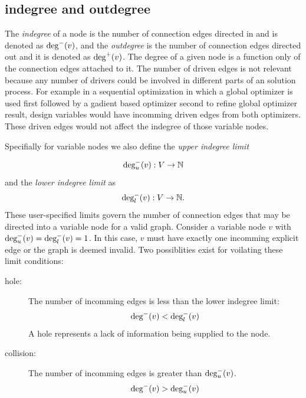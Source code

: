 \subsection{indegree and outdegree}
  \label{s:indegree-outdegree}
  The \emph{indegree} of a node is the number of connection edges directed in and 
  is denoted as $\textrm{deg}^-(v)$, and the \emph{outdegree} 
  is the number of connection edges directed out and it is denoted as $\textrm{deg}^+(v)$.
  The degree of a given node is a function only of the connection edges 
  attached to it. The number of driven edges is not relevant because any number 
  of drivers could be involved in different parts of an solution process. For 
  example in a sequential optimization in which a global optimizer is used first 
  followed by a gadient based optimizer second to refine global optimizer 
  result, design variables would have incomming driven edges from both optimizers. 
  These driven edges would not affect the indegree of those variable nodes. 

  Specifially for variable nodes we also define the \emph{upper indegree limit} 

  \begin{equation}
  \textrm{deg}_u^-(v):V \to \mathbb{N}
  \end{equation} 
  and the \emph{lower indegree limit} as
  \begin{equation}
  \textrm{deg}_l^-(v):V \to \mathbb{N}.
  \end{equation}
  These user-specified limits govern the number of connection edges that may 
  be directed into a variable node for a valid graph. Consider a variable 
  node $v$ with $\textrm{deg}_u^-(v) = \textrm{deg}_l^-(v) = 1$. In this case, $v$ 
  must have exactly one incomming explicit edge or the graph is deemed invalid. 
  Two possiblities exist for voilating these limit conditions: 

  \begin{description}
    \item[hole: ] The number of incomming edges is less than the lower indegree limit:
      \begin{equation} \textrm{deg}^-(v) < \textrm{deg}_l^-(v) \label{e:hole} \end{equation}
      A hole represents a lack of information being supplied to the node.
    \item[collision: ] The number of incomming edges is greater than $ \textrm{deg}_u^-(v)$. 
      \begin{equation} \textrm{deg}^-(v) > \textrm{deg}_u^-(v) \label{e:collision}\end{equation}
  \end{description} 

